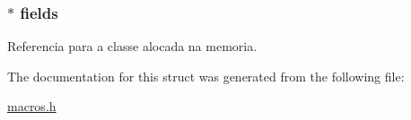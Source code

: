 \subsubsection[{fields}]{$\ast$ fields}\label{struct_object__t_ae01d16d1ab715a4f5dd1fe8254322594}


Referencia para a classe alocada na memoria. 



The documentation for this struct was generated from the following file\+:\begin{DoxyCompactItemize}
\item 
\hyperlink{macros_8h}{macros.\+h}\end{DoxyCompactItemize}
